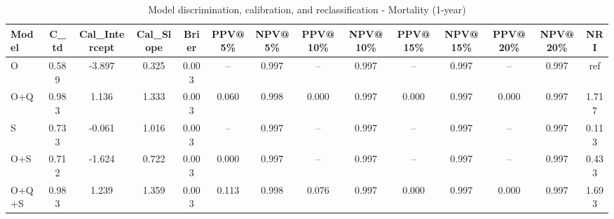 \begin{table}[htbp]
\centering
\small
\caption{Model discrimination, calibration, and reclassification - Mortality (1-year)}
\label{tab:perf_mortality_1y}
\begin{tabular}{lccccccccccccc}
\toprule
Model & C\_td & Cal\_Intercept & Cal\_Slope & Brier & PPV@5\% & NPV@5\% & PPV@10\% & NPV@10\% & PPV@15\% & NPV@15\% & PPV@20\% & NPV@20\% & NRI \\
\midrule
O & 0.589 & -3.897 & 0.325 & 0.003 & -- & 0.997 & -- & 0.997 & -- & 0.997 & -- & 0.997 & ref \\
O+Q & 0.983 & 1.136 & 1.333 & 0.003 & 0.060 & 0.998 & 0.000 & 0.997 & 0.000 & 0.997 & 0.000 & 0.997 & 1.717 \\
S & 0.733 & -0.061 & 1.016 & 0.003 & -- & 0.997 & -- & 0.997 & -- & 0.997 & -- & 0.997 & 0.113 \\
O+S & 0.712 & -1.624 & 0.722 & 0.003 & 0.000 & 0.997 & -- & 0.997 & -- & 0.997 & -- & 0.997 & 0.433 \\
O+Q+S & 0.983 & 1.239 & 1.359 & 0.003 & 0.113 & 0.998 & 0.076 & 0.997 & 0.000 & 0.997 & 0.000 & 0.997 & 1.693 \\
\bottomrule
\end{tabular}
\end{table}